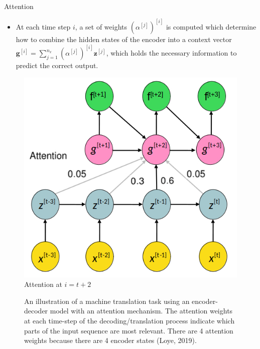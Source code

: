 \begin{vbframe}{Attention}
\framebreak
\begin{itemize}  
    \item At each time step $i$, a set of weights $(\alpha^{[j]})^{[i]}$ is computed which determine how to combine the hidden states of the encoder into a context vector $\mathbf{g}^{[i]}= \sum_{j=1}^{n_x} (\alpha^{[j]})^{[i]} \mathbf{z}^{[j]}$, which holds the necessary information to predict the correct output.
  \end{itemize}
  \begin{figure}
    \includegraphics[width=5.cm]{figure/seq2seq_4.png}
    \caption{Attention at $i=t+2$}
  \end{figure}
  
\framebreak
  
  \lz
  \lz
  \begin{figure}
    \centering
    \caption{ An illustration of a machine translation task using an encoder-decoder model with an attention mechanism. The attention weights at each time-step of the decoding/translation process indicate which parts of the input sequence are most relevant. There are 4 attention weights because there are 4 encoder states (Loye, 2019).}
  \end{figure}
  
  
\end{vbframe}


